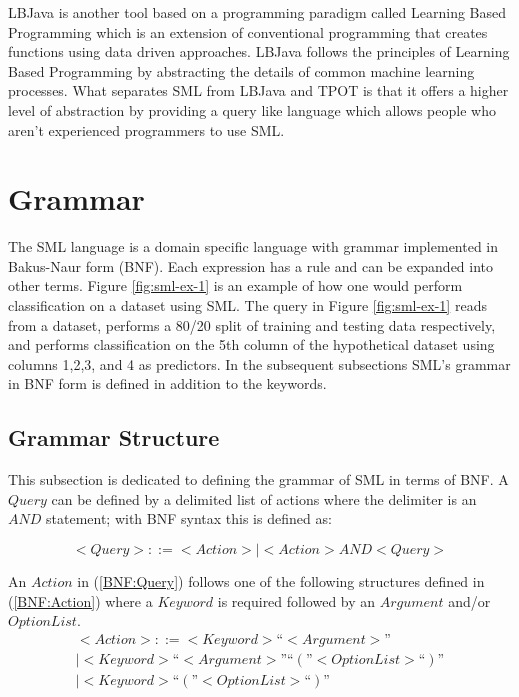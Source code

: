 \documentclass[jair,twoside,11pt,theapa]{article}
\begin{document}
LBJava \cite{RizzoloRo10} is another tool  based on a programming paradigm called Learning Based Programming \cite{Roth05} which is an extension of conventional programming that creates functions using data driven approaches. LBJava follows the principles of Learning Based Programming by abstracting the details of common machine learning processes. What separates SML from LBJava and TPOT is that it offers a higher level of abstraction by providing a query like language which allows people who aren't experienced programmers to use SML.

\section{Grammar}
\label{grammar}

The SML language is a domain specific language with grammar implemented in Bakus-Naur form (BNF). Each expression has a rule and can be expanded into other terms. Figure \ref{fig:sml-ex-1} is an example of how one would perform classification on a dataset using SML. The query in Figure \ref{fig:sml-ex-1} reads from a dataset, performs a 80/20 split of training and testing data respectively, and performs classification on the 5th column of the hypothetical dataset using columns 1,2,3, and 4 as predictors. In the subsequent subsections SML's grammar in BNF form is defined in addition to the keywords.

\subsection{Grammar Structure}
This subsection is dedicated to defining the grammar of SML in terms of BNF. A \(Query\) can be defined by a delimited list of actions where the delimiter is an \(AND\) statement; with BNF syntax this is defined as:

\begin{equation} \label{BNF:Query}
<Query> ::= <Action> | <Action> AND <Query>
\end{equation}

An \(Action\) in (\ref{BNF:Query}) follows one of the following structures defined in (\ref{BNF:Action}) where a \(Keyword\) is required followed by an \(Argument\) and/or \(OptionList\).
\begin{equation} \label{BNF:Action}
\begin{split}
<Action> ::= <Keyword> “<Argument>” \\
| <Keyword> “<Argument>” “(”<Option List>“)” \\
| <Keyword> “(”<Option List>“)”
\end{split}
\end{equation}
\end{document}

